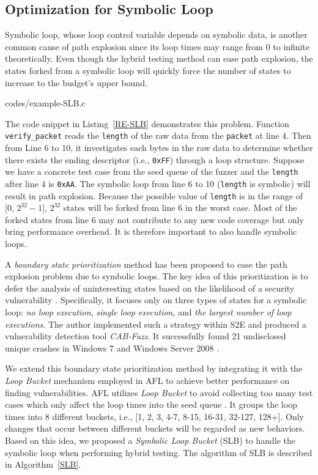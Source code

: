 \subsection{Optimization for Symbolic Loop}
Symbolic loop, whose loop control variable depends on symbolic data, 
is another common cause of path explosion since its loop times may 
range from 0 to infinite theoretically. 
Even though the hybrid testing method can ease path explosion, the 
states forked from a symbolic loop will quickly force the number of 
states to increase to the budget's upper bound. 


{codes/example-SLB.c} 

The code snippet in Listing~\ref{RE-SLB} demonstrates this problem. 
Function \texttt{verify\_packet} reads the \texttt{length} of the 
raw data from the \texttt{packet} at line 4.
 Then from Line 6 to 10, it investigates each bytes in the raw data 
 to determine whether there exists the ending descriptor 
 (i.e., \texttt{0xFF}) through a loop structure. 
 Suppose we have a concrete test case from the seed queue of 
 the fuzzer and the \texttt{length} after line 4 is \texttt{0xAA}. 
 The symbolic loop 
 from line 6 to 10 (\texttt{length} is symbolic) 
 will result in path explosion.
 Because the possible value of \texttt{length} is in the 
 range of [0, $2^{32}-1$], $2^{32}$ states will be forked from 
 line 6 in the worst case. 
Most of the forked states from line 6 may not contribute 
to any new code coverage but only bring performance overhead.
It is therefore important to also handle symbolic loops. 

A \textit{boundary state prioritization} method has been proposed 
to ease the path explosion problem due to symbolic loops.
The key idea of this prioritization is to defer the analysis of 
uninteresting states based on the likelihood of a security vulnerability \cite{cab-fuzz}. 
Specifically, it focuses only on three types of states for a symbolic 
loop: \textit{no loop execution}, \textit{single loop execution}, and 
\textit{the largest number of loop executions}.
The author implemented such a strategy within S2E \cite{chipounov2011s2e} 
and produced a vulnerability detection tool \textit{CAB-Fuzz}.
It successfully found 21 undisclosed unique crashes in Windows 7 and 
Windows Server 2008 \cite{cab-fuzz}.
 
We extend this boundary state prioritization method by integrating it 
with the \emph{Loop Bucket} mechanism employed in AFL \cite{online:afl} 
to achieve better performance on finding vulnerabilities.
AFL utilizes \emph{Loop Bucket} to avoid collecting too many test cases 
which only affect the loop times into the seed queue \cite{online:afl}. 
It groups the loop times into 8 different buckets, i.e., 
[1, 2, 3, 4-7, 8-15, 16-31, 32-127, 128+]. Only changes that occur 
between different buckets will be regarded as new behaviors. 
Based on this idea, we proposed a \textit{Symbolic Loop Bucket} (SLB) 
to handle the symbolic loop when performing hybrid testing. The 
algorithm of SLB is described in Algorithm~\ref{SLB}.

